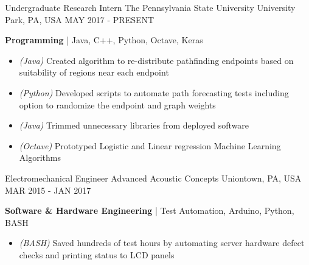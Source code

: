 
\begin{cventries}
	\cventry
	{Undergraduate Research Intern} %
	{The Pennsylvania State University} %
	{University Park, PA, USA} %
	{MAY 2017 - PRESENT} %
	{
		\begin{cvitems} %
			\item {\textbf{Programming} | {\color{awesome}Java, C++, Python, Octave, Keras}
				\begin{itemize}[noitemsep,wide=0pt, leftmargin=\dimexpr{} + 2\relax]
					\item[\textbullet]{\textit{(Java)} Created algorithm to re-distribute pathfinding endpoints based on suitability of regions near each endpoint}
					\item[\textbullet]{\textit{(Python)} Developed scripts to automate path forecasting tests including option to randomize the endpoint and graph weights}
					\item[\textbullet]{\textit{(Java)} Trimmed unnecessary libraries from deployed software}
					\item[\textbullet]{\textit{(Octave)} Prototyped Logistic and Linear regression Machine Learning Algorithms}
				\end{itemize}}
		\end{cvitems}
	}
	\cventry
	{Electromechanical Engineer} %
	{Advanced Acoustic Concepts} %
	{Uniontown, PA, USA} %
	{MAR 2015 - JAN 2017} %
	{
		\begin{cvitems} %
			\item {\textbf{Software \& Hardware Engineering} | {\color{awesome}Test Automation, Arduino, Python, BASH}
				\begin{itemize}[noitemsep,wide=0pt, leftmargin=\dimexpr{} + 2\relax]
					\item[\textbullet]{\textit{(BASH)} Saved hundreds of test hours by automating server hardware defect checks and printing status to LCD panels}

\end{itemize}}
\end{cvitems}}
\end{cventries}
